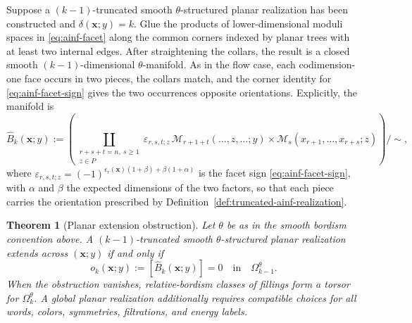 \documentclass[11pt,letterpaper,twoside]{article}
\theoremstyle{plain}
\newtheorem{theorem}{Theorem}[section]
\theoremstyle{definition}
\theoremstyle{remark}
\begin{document}
Suppose a \((k-1)\)-truncated smooth \(\theta\)-structured planar realization has been constructed and \(\delta(\mathbf x;y)=k\).  Glue the products of lower-dimensional moduli spaces in \eqref{eq:ainf-facet} along the common corners indexed by planar trees with at least two internal edges.  After straightening the collars, the result is a closed smooth \((k-1)\)-dimensional \(\theta\)-manifold.  As in the flow case, each codimension-one face occurs in two pieces, the collars match, and the corner identity for \eqref{eq:ainf-facet-sign} gives the two occurrences opposite orientations.  Explicitly, the manifold is
\begin{equation}\label{eq:assembled-ainf-boundary}
 \widehat B_k(\mathbf x;y)
 :=
 \left(
 \coprod_{\substack{r+s+t=n,\ s\geq1\\z\in P}}
 \varepsilon_{r,s,t;z}\,
 \mathcal M_{r+1+t}(\ldots,z,\ldots;y)
 \times
 \mathcal M_s(x_{r+1},\ldots,x_{r+s};z)
 \right)\big/\!\sim ,
\end{equation}
where \(\varepsilon_{r,s,t;z}=(-1)^{\epsilon_r(\mathbf x)(1+\beta)+\beta(1+\alpha)}\) is the facet sign \eqref{eq:ainf-facet-sign}, with \(\alpha\) and \(\beta\) the expected dimensions of the two factors, so that each piece carries the orientation prescribed by Definition~\ref{def:truncated-ainf-realization}.

\begin{theorem}[Planar extension obstruction]\label{thm:ainf-obstruction-tower}
Let \(\theta\) be as in the smooth bordism convention above.  A \((k-1)\)-truncated smooth \(\theta\)-structured planar realization extends across \((\mathbf x;y)\) if and only if
\begin{equation}\label{eq:ainf-obstruction-class}
 o_k(\mathbf x;y)
 :=
 [\widehat B_k(\mathbf x;y)]
 =0
 \quad\text{in}\quad
 \Omega_{k-1}^{\theta}.
\end{equation}
When the obstruction vanishes, relative-bordism classes of fillings form a torsor for \(\Omega_k^\theta\).  A global planar realization additionally requires compatible choices for all words, colors, symmetries, filtrations, and energy labels.
\end{theorem}
\end{document}

